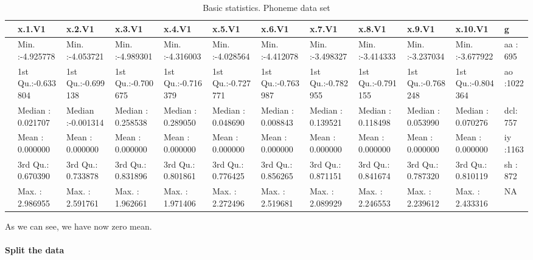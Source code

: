 \documentclass[
]{article}
\begin{document}
\begin{table}

\caption{\label{tab:unnamed-chunk-23}Basic statistics. Phoneme data set}
\centering
\begin{tabular}[t]{l|l|l|l|l|l|l|l|l|l|l|l}
\hline
  &       x.1.V1        &       x.2.V1        &       x.3.V1        &       x.4.V1        &       x.5.V1        &       x.6.V1        &       x.7.V1        &       x.8.V1        &       x.9.V1        &       x.10.V1       &   g\\
\hline
 & Min.   :-4.925778 & Min.   :-4.053721 & Min.   :-4.989301 & Min.   :-4.316003 & Min.   :-4.028564 & Min.   :-4.412078 & Min.   :-3.498327 & Min.   :-3.414333 & Min.   :-3.237034 & Min.   :-3.677922 & aa : 695\\
\hline
 & 1st Qu.:-0.633804 & 1st Qu.:-0.699138 & 1st Qu.:-0.700675 & 1st Qu.:-0.716379 & 1st Qu.:-0.727771 & 1st Qu.:-0.763987 & 1st Qu.:-0.782955 & 1st Qu.:-0.791155 & 1st Qu.:-0.768248 & 1st Qu.:-0.804364 & ao :1022\\
\hline
 & Median : 0.021707 & Median :-0.001314 & Median : 0.258538 & Median : 0.289050 & Median : 0.048690 & Median : 0.008843 & Median : 0.139521 & Median : 0.118498 & Median : 0.053990 & Median : 0.070276 & dcl: 757\\
\hline
 & Mean   : 0.000000 & Mean   : 0.000000 & Mean   : 0.000000 & Mean   : 0.000000 & Mean   : 0.000000 & Mean   : 0.000000 & Mean   : 0.000000 & Mean   : 0.000000 & Mean   : 0.000000 & Mean   : 0.000000 & iy :1163\\
\hline
 & 3rd Qu.: 0.670390 & 3rd Qu.: 0.733878 & 3rd Qu.: 0.831896 & 3rd Qu.: 0.801861 & 3rd Qu.: 0.776425 & 3rd Qu.: 0.856265 & 3rd Qu.: 0.871151 & 3rd Qu.: 0.841674 & 3rd Qu.: 0.787320 & 3rd Qu.: 0.810119 & sh : 872\\
\hline
 & Max.   : 2.986955 & Max.   : 2.591761 & Max.   : 1.962661 & Max.   : 1.971406 & Max.   : 2.272496 & Max.   : 2.519681 & Max.   : 2.089929 & Max.   : 2.246553 & Max.   : 2.239612 & Max.   : 2.433316 & NA\\
\hline
\end{tabular}
\end{table}

As we can see, we have now zero mean.

\hypertarget{split-the-data}{%
\paragraph{Split the data}\label{split-the-data}}
\end{document}
